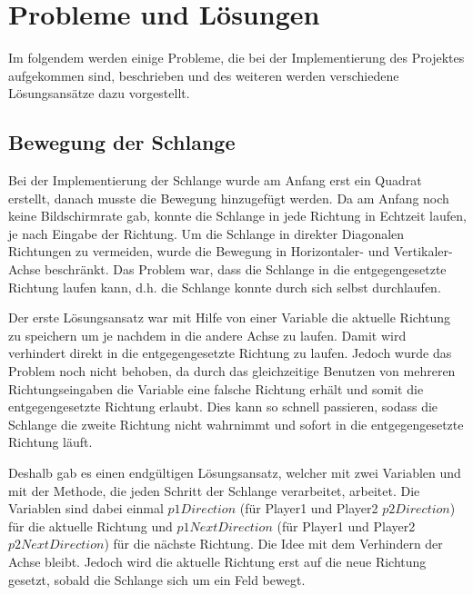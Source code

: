 
\chapter{Probleme und L{\"o}sungen}
\label{Probleme_und_Loesungen}
%
Im folgendem werden einige Probleme, die bei der Implementierung des Projektes aufgekommen sind, beschrieben und des weiteren werden verschiedene L{\"o}sungsans{\"a}tze dazu vorgestellt.

\section{Bewegung der Schlange}
\label{Bewegung der Schlange}
%
Bei der Implementierung der Schlange wurde am Anfang erst ein Quadrat erstellt, danach musste die Bewegung hinzugef{\"u}gt werden. Da am Anfang noch keine Bildschirmrate gab, konnte die Schlange in jede Richtung in Echtzeit laufen, je nach Eingabe der Richtung. Um die Schlange in direkter Diagonalen Richtungen zu vermeiden, wurde die Bewegung in Horizontaler- und Vertikaler-Achse beschr{\"a}nkt. Das Problem war, dass die Schlange in die entgegengesetzte Richtung laufen kann, d.h. die Schlange konnte durch sich selbst durchlaufen.

Der erste L{\"o}sungsansatz war mit Hilfe von einer Variable die aktuelle Richtung zu speichern um je nachdem in die andere Achse zu laufen. Damit wird verhindert direkt in die entgegengesetzte Richtung zu laufen. Jedoch wurde das Problem noch nicht behoben, da durch das gleichzeitige Benutzen von mehreren Richtungseingaben die Variable eine falsche Richtung erh{\"a}lt und somit die entgegengesetzte Richtung erlaubt. Dies kann so schnell passieren, sodass die Schlange die zweite Richtung nicht wahrnimmt und sofort in die entgegengesetzte Richtung l{\"a}uft.

Deshalb gab es einen endg{\"u}ltigen L{\"o}sungsansatz, welcher mit zwei Variablen und mit der Methode, die jeden Schritt der Schlange verarbeitet, arbeitet. Die Variablen sind dabei einmal $p1Direction$ (f{\"u}r Player1 und Player2 $p2Direction$) f{\"u}r die aktuelle Richtung und $p1NextDirection$ (f{\"u}r Player1 und Player2 $p2NextDirection$) f{\"u}r die n{\"a}chste Richtung. Die Idee mit dem Verhindern der Achse bleibt. Jedoch wird die aktuelle Richtung erst auf die neue Richtung gesetzt, sobald die Schlange sich um ein Feld bewegt. 
\newpage
%
